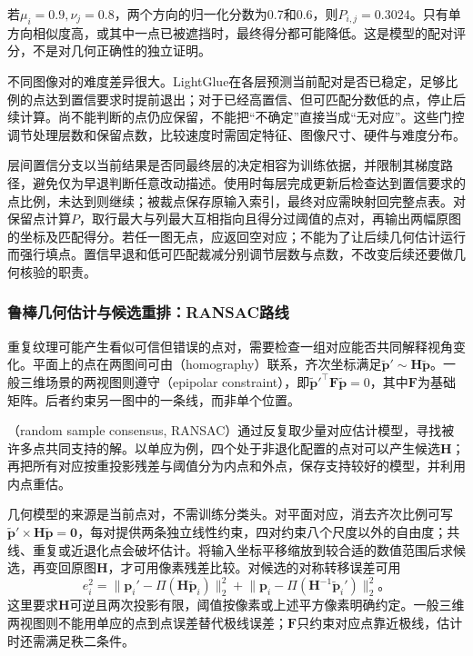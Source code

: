 若$\mu_i=0.9,\nu_j=0.8$，两个方向的归一化分数为0.7和0.6，则$P_{i,j}=0.3024$。只有单方向相似度高，或其中一点已被遮挡时，最终得分都可能降低。这是模型的配对评分，不是对几何正确性的独立证明。

不同图像对的难度差异很大。LightGlue在各层预测当前配对是否已稳定，足够比例的点达到置信要求时提前退出；对于已经高置信、但可匹配分数低的点，停止后续计算。尚不能判断的点仍应保留，不能把“不确定”直接当成“无对应”。这些门控调节处理层数和保留点数，比较速度时需固定特征、图像尺寸、硬件与难度分布。

层间置信分支以当前结果是否同最终层的决定相容为训练依据，并限制其梯度路径，避免仅为早退判断任意改动描述。使用时每层完成更新后检查达到置信要求的点比例，未达到则继续；被裁点保存原输入索引，最终对应需映射回完整点表。对保留点计算$P$，取行最大与列最大互相指向且得分过阈值的点对，再输出两幅原图的坐标及匹配得分。若任一图无点，应返回空对应；不能为了让后续几何估计运行而强行填点。置信早退和低可匹配裁减分别调节层数与点数，不改变后续还要做几何核验的职责。

\subsubsection{鲁棒几何估计与候选重排：RANSAC路线}
\label{sec:vision-recognition-ransac}

重复纹理可能产生看似可信但错误的点对，需要检查一组对应能否共同解释视角变化。平面上的点在两图间可由（homography）联系，齐次坐标满足$\tilde{\bm{p}}'\sim\bm{H}\tilde{\bm{p}}$。一般三维场景的两视图则遵守（epipolar constraint），即$\tilde{\bm{p}}'^\top\bm{F}\tilde{\bm{p}}=0$，其中$\bm{F}$为基础矩阵。后者约束另一图中的一条线，而非单个位置。

（random sample consensus, RANSAC）通过反复取少量对应估计模型，寻找被许多点共同支持的解。以单应为例，四个处于非退化配置的点对可以产生候选$\bm{H}$；再把所有对应按重投影残差与阈值分为内点和外点，保存支持较好的模型，并利用内点重估。

几何模型的来源是当前点对，不需训练分类头。对平面对应，消去齐次比例可写$\tilde{\bm p}'\times\bm H\tilde{\bm p}=\bm0$，每对提供两条独立线性约束，四对约束八个尺度以外的自由度；共线、重复或近退化点会破坏估计。将输入坐标平移缩放到较合适的数值范围后求候选，再变回原图$\bm H$，才可用像素残差比较。对候选的对称转移误差可用
\[
 e_i^2=\lVert\bm p_i'-\Pi(\bm H\tilde{\bm p}_i)\rVert_2^2
       +\lVert\bm p_i-\Pi(\bm H^{-1}\tilde{\bm p}_i')\rVert_2^2\text{。}
\]
这里要求$\bm H$可逆且两次投影有限，阈值按像素或上述平方像素明确约定。一般三维两视图则不能用单应的点到点误差替代极线误差；$\bm F$只约束对应点靠近极线，估计时还需满足秩二条件。

